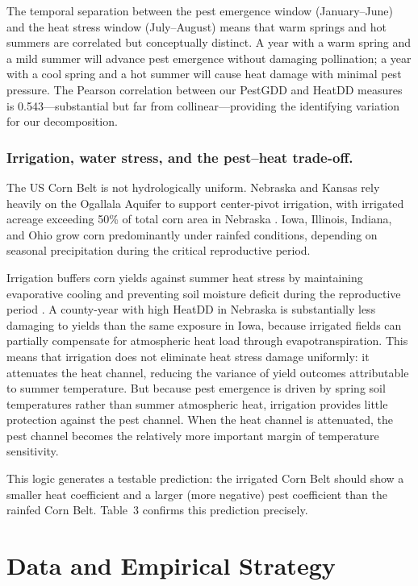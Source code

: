 \documentclass[12pt]{article}
\begin{document}
The temporal separation between the pest emergence window (January--June) and the heat stress window (July--August) means that warm springs and hot summers are correlated but conceptually distinct. A year with a warm spring and a mild summer will advance pest emergence without damaging pollination; a year with a cool spring and a hot summer will cause heat damage with minimal pest pressure. The Pearson correlation between our PestGDD and HeatDD measures is 0.543---substantial but far from collinear---providing the identifying variation for our decomposition.

\subsubsection*{Irrigation, water stress, and the pest--heat trade-off.}
The US Corn Belt is not hydrologically uniform. Nebraska and Kansas rely heavily on the Ogallala Aquifer to support center-pivot irrigation, with irrigated acreage exceeding 50\% of total corn area in Nebraska \citep{lobell2014greater, schlenker2005will}. Iowa, Illinois, Indiana, and Ohio grow corn predominantly under rainfed conditions, depending on seasonal precipitation during the critical reproductive period.

Irrigation buffers corn yields against summer heat stress by maintaining evaporative cooling and preventing soil moisture deficit during the reproductive period \citep{massetti2011irrigation}. A county-year with high HeatDD in Nebraska is substantially less damaging to yields than the same exposure in Iowa, because irrigated fields can partially compensate for atmospheric heat load through evapotranspiration. This means that irrigation does not eliminate heat stress damage uniformly: it attenuates the heat channel, reducing the variance of yield outcomes attributable to summer temperature. But because pest emergence is driven by spring soil temperatures rather than summer atmospheric heat, irrigation provides little protection against the pest channel. When the heat channel is attenuated, the pest channel becomes the relatively more important margin of temperature sensitivity.

This logic generates a testable prediction: the irrigated Corn Belt should show a smaller heat coefficient and a larger (more negative) pest coefficient than the rainfed Corn Belt. Table~3 confirms this prediction precisely.


\section{Data and Empirical Strategy}
\end{document}
